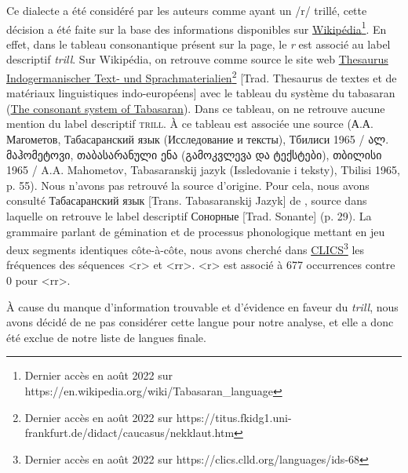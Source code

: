 Ce dialecte a été considéré par les auteurs comme ayant un /r/ trillé, cette décision a été faite sur la base des informations disponibles sur \href{https://en.wikipedia.org/wiki/Tabasaran_language}{Wikipédia\footnote{Dernier accès en août 2022 sur \url{https://en.wikipedia.org/wiki/Tabasaran_language}}}. En effet, dans le tableau consonantique présent sur la page, le \textit{r} est associé au label descriptif \textit{trill}. Sur Wikipédia, on retrouve comme source le site web \href{https://titus.fkidg1.uni-frankfurt.de/didact/caucasus/nekklaut.htm}{Thesaurus Indogermanischer Text- und Sprachmaterialien\footnote{Dernier accès en août 2022 sur \url{https://titus.fkidg1.uni-frankfurt.de/didact/caucasus/nekklaut.htm}}} [Trad. Thesaurus de textes et de matériaux linguistiques indo-européens] avec le tableau du système du tabasaran (\href{https://titus.fkidg1.uni-frankfurt.de/didact/caucasus/nekklaut.htm#XFN3}{The consonant system of Tabasaran}). Dans ce tableau, on ne retrouve aucune mention du label descriptif \textsc{trill}. À ce tableau est associée une source (А.А. Магометов, Табасаранский язык (Исследование и тексты), Тбилиси 1965 / {ალ. მაჰომეტოვი, თაბასარანული ენა (გამოკვლევა და ტექსტები), თბილისი} 1965 / A.A. Mahometov, Tabasaranskij jazyk (Issledovanie i teksty), Tbilisi 1965, p. 55).
Nous n'avons pas retrouvé la source d'origine. Pour cela, nous avons consulté Табасаранский язык [Trans. Tabasaranskij Jazyk] de \textcite{alekseevm.e.TabasaranskiyYazyk2003}, source dans laquelle on retrouve le label descriptif Сонорные [Trad. Sonante] (p. 29). La grammaire parlant de gémination et de processus phonologique mettant en jeu deux segments identiques côte-à-côte, nous avons cherché dans \href{https://clics.clld.org/languages/ids-68}{CLICS\footnote{Dernier accès en août 2022 sur \url{https://clics.clld.org/languages/ids-68}}} les fréquences des séquences <r> et <rr>. <r> est associé à 677 occurrences contre 0 pour <rr>.%

À cause du manque d'information trouvable et d'évidence en faveur du \textit{trill}, nous avons décidé de ne pas considérer cette langue pour notre analyse, et elle a donc été exclue de notre liste de langues finale.\\

